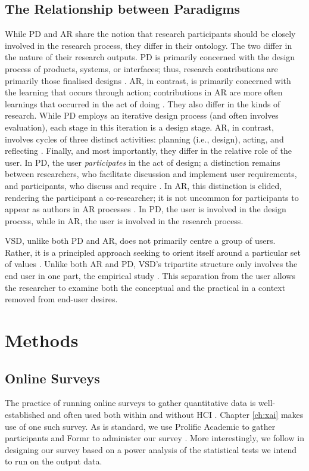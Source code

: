 \subsection{The Relationship between Paradigms}
While PD and AR share the notion that research participants should be closely involved in the research process, they differ in their ontology. The two differ in the nature of their research outputs. PD is primarily concerned with the design process of products, systems, or interfaces; thus, research contributions are primarily those finalised designs \cite{zimmerman_research_2014}. AR, in contrast, is primarily concerned with the learning that occurs through action; contributions in AR are more often learnings that occurred in the act of doing \cite{Hult1980TOWARDSAD}. They also differ in the kinds of research. While PD employs an iterative design process (and often involves evaluation), each stage in this iteration is a design stage. AR, in contrast, involves cycles of three distinct activities: planning (i.e., design), acting, and reflecting \cite{Hult1980TOWARDSAD}. Finally, and most importantly, they differ in the relative role of the user. In PD, the user \emph{participates} in the act of design; a distinction remains between researchers, who facilitate discussion and implement user requirements, and participants, who discuss and require \cite{Hussain2014OverviewOV}. In AR, this distinction is elided, rendering the participant a co-researcher; it is not uncommon for participants to appear as authors in AR processes \cite{Hayes_2011}. In PD, the user is involved in the design process, while in AR, the user is involved in the research process.

VSD, unlike both PD and AR, does not primarily centre a group of users. Rather, it is a principled approach seeking to orient itself around a particular set of values \cite{10.1145/242485.242493}. Unlike both AR and PD, VSD's tripartite structure only involves the end user in one part, the empirical study \cite{10.1145/242485.242493}. This separation from the user allows the researcher to examine both the conceptual and the practical in a context removed from end-user desires.

\section{Methods}
\subsection{Online Surveys}
The practice of running online surveys to gather quantitative data is well-established and often used both within and without HCI \cite{zhao2023fairness,pillai_adoption_2020,krishna_disagreement_2022,mai_user_nodate,bansal_does_2021,binns_its_2018,dzindolet_role_2003,papenmeier_its_2022}. Chapter \ref{ch:xai} makes use of one such survey. As is standard, we use Prolific Academic to gather participants and Formr to administer our survey \cite{binns_its_2018,Arslan_formr_2019}. More interestingly, we follow \textcite{caldwell_power_nodate} in designing our survey based on a power analysis of the statistical tests we intend to run on the output data.

